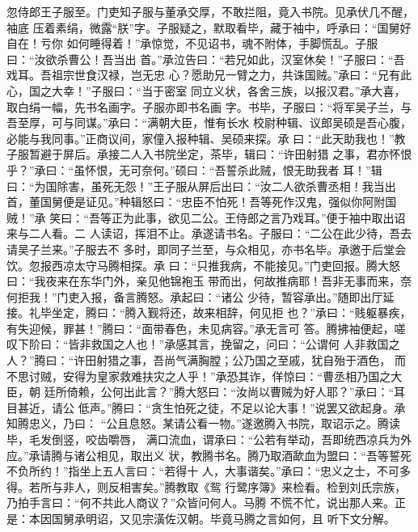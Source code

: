 忽侍郎王子服至。门吏知子服与董承交厚，不敢拦阻，竟入书院。见承伏几不醒，袖底
压着素绢，微露“朕”字。子服疑之，默取看毕，藏于袖中，呼承曰：“国舅好自在！亏你
如何睡得着！”承惊觉，不见诏书，魂不附体，手脚慌乱。子服曰：“汝欲杀曹公！吾当出
首。”承泣告曰：“若兄如此，汉室休矣！”子服曰：“吾戏耳。吾祖宗世食汉禄，岂无忠
心？愿助兄一臂之力，共诛国贼。”承曰：“兄有此心，国之大幸！”子服曰：“当于密室
同立义状，各舍三族，以报汉君。”承大喜，取白绢一幅，先书名画字。子服亦即书名画
字。书毕，子服曰：“将军吴子兰，与吾至厚，可与同谋。”承曰：“满朝大臣，惟有长水
校尉种辑、议郎吴硕是吾心腹，必能与我同事。”正商议间，家僮入报种辑、吴硕来探。承
曰：“此天助我也！”教子服暂避于屏后。承接二人入书院坐定，茶毕，辑曰：“许田射猎
之事，君亦怀恨乎？”承曰：“虽怀恨，无可奈何。”硕曰：“吾誓杀此贼，恨无助我者
耳！”辑曰：“为国除害，虽死无怨！”王子服从屏后出曰：“汝二人欲杀曹丞相！我当出
首，董国舅便是证见。”种辑怒曰：“忠臣不怕死！吾等死作汉鬼，强似你阿附国贼！”承
笑曰：“吾等正为此事，欲见二公。王侍郎之言乃戏耳。”便于袖中取出诏来与二人看。二
人读诏，挥泪不止。承遂请书名。子服曰：“二公在此少待，吾去请吴子兰来。”子服去不
多时，即同子兰至，与众相见，亦书名毕。承邀于后堂会饮。忽报西凉太守马腾相探。承
曰：“只推我病，不能接见。”门吏回报。腾大怒曰：“我夜来在东华门外，亲见他锦袍玉
带而出，何故推病耶！吾非无事而来，奈何拒我！”门吏入报，备言腾怒。承起曰：“诸公
少待，暂容承出。”随即出厅延接。礼毕坐定，腾曰：“腾入觐将还，故来相辞，何见拒
也？”承曰：“贱躯暴疾，有失迎候，罪甚！”腾曰：“面带春色，未见病容。”承无言可
答。腾拂袖便起，嗟叹下阶曰：“皆非救国之人也！”承感其言，挽留之，问曰：“公谓何
人非救国之人？”腾曰：“许田射猎之事，吾尚气满胸膛；公乃国之至戚，犹自殆于酒色，
而不思讨贼，安得为皇家救难扶灾之人乎！”承恐其诈，佯惊曰：“曹丞相乃国之大臣，朝
廷所倚赖，公何出此言？”腾大怒曰：“汝尚以曹贼为好人耶？”承曰：“耳目甚近，请公
低声。”腾曰：“贪生怕死之徒，不足以论大事！”说罢又欲起身。承知腾忠义，乃曰：
“公且息怒。某请公看一物。”遂邀腾入书院，取诏示之。腾读毕，毛发倒竖，咬齿嚼唇，
满口流血，谓承曰：“公若有举动，吾即统西凉兵为外应。”承请腾与诸公相见，取出义
状，教腾书名。腾乃取酒歃血为盟曰：“吾等誓死不负所约！”指坐上五人言曰：“若得十
人，大事谐矣。”承曰：“忠义之士，不可多得。若所与非人，则反相害矣。”腾教取《鸳
行鹭序簿》来检看。检到刘氏宗族，乃拍手言曰：“何不共此人商议？”众皆问何人。马腾
不慌不忙，说出那人来。正是：本因国舅承明诏，又见宗潢佐汉朝。毕竟马腾之言如何，且
听下文分解。